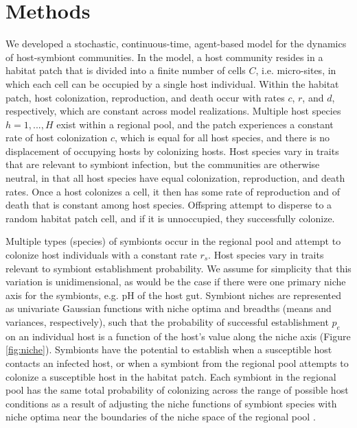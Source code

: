 \documentclass[12pt]{article}
\begin{document}
\section*{Methods}

We developed a stochastic, continuous-time, agent-based model for the dynamics of host-symbiont communities.  In the model, a host community resides in a habitat patch that is divided into a finite number of cells $C$, i.e. micro-sites, in which each cell can be occupied by a single host individual.
Within the habitat patch, host colonization, reproduction, and death occur with rates $c$, $r$, and $d$, respectively, which are constant across model realizations.
Multiple host species $h=1, ..., H$ exist within a regional pool, and the patch experiences a constant rate of host colonization $c$, which is equal for all host species, and there is no displacement of occupying hosts by colonizing hosts. 
Host species vary in traits that are relevant to symbiont infection, but the communities are otherwise neutral, in that all host species have equal colonization, reproduction, and death rates. 
Once a host colonizes a cell, it then has some rate of reproduction and of death that is constant among host species.
Offspring attempt to disperse to a random habitat patch cell, and if it is unnoccupied, they successfully colonize.

Multiple types (species) of symbionts occur in the regional pool and attempt to colonize host individuals with a constant rate $r_s$. 
Host species vary in traits relevant to symbiont establishment probability. 
We assume for simplicity that this variation is unidimensional, as would be the case if there were one primary niche axis for the symbionts, e.g. pH of the host gut.
Symbiont niches are represented as univariate Gaussian functions with niche optima and breadths (means and variances, respectively), such that the probability of successful establishment $p_e$ on an individual host is a function of the host's value along the niche axis (Figure \ref{fig:niche}). 
Symbionts have the potential to establish when a susceptible host contacts an infected host, or when a symbiont from the regional pool attempts to colonize a susceptible host in the habitat patch.
Each symbiont in the regional pool has the same total probability of colonizing across the range of possible host conditions as a result of adjusting the niche functions of symbiont species with niche optima near the boundaries of  the niche space of the regional pool \citep{Allouche2012}.
 
\end{document}
